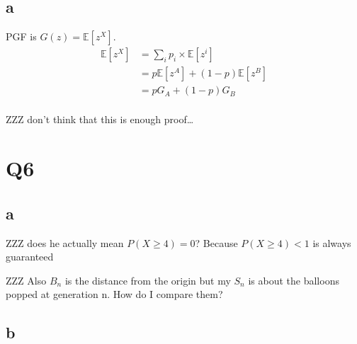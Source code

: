 \documentclass{article}
\newcommand{\expect}{\mathbb{E}}
\begin{document}
\subsection{a}
PGF is $G(z) = \expect \left[z^X\right]$.
\begin{align*}
    \expect \left[z^X\right]
    &= \sum_i p_i \times \expect \left[z^i\right] \\
    &= p \expect\left[z^A\right] + (1-p) \expect \left[z^B\right] \\
    &= p G_A + (1-p) G_B \\
\end{align*}

ZZZ don't think that this is enough proof\ldots

\section{Q6}
\subsection{a}
ZZZ does he actually mean $P(X \geq 4) = 0$? Because $P(X \geq 4) < 1$ is always
guaranteed

ZZZ Also $B_n$ is the distance from the origin but my $S_n$ is about the balloons
popped at generation n. How do I compare them?

\subsection{b}
\end{document}
